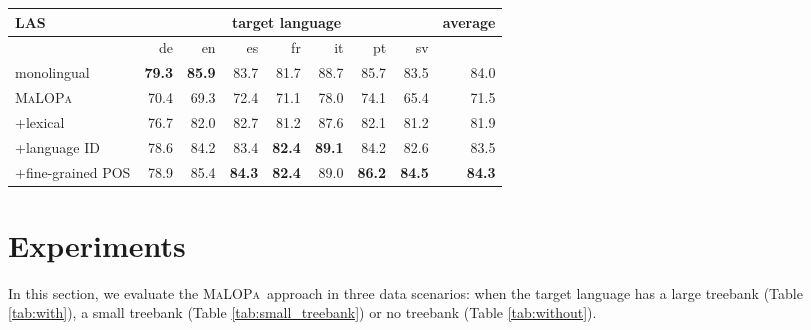 \documentclass[11pt]{article}
\newcommand{\malopa}{\textsc{MaLOPa}}
\begin{document}
\begin{table*}[!]
\centering



\begin{tabular}{l|r|r|r|r|r|r|r||r}
LAS & \multicolumn{7}{c||}{target language} & average \\ \hline
                                                       & {de} & {en} & {es} & {fr} & {it} & {pt} & {sv} & {}   \\ \hline
monolingual                                   & \textbf{79.3} & \textbf{85.9} & 83.7 & 81.7 & 88.7 & 85.7 & 83.5 & 84.0 \\ \hline
\malopa                            & 70.4 & 69.3 & 72.4 & 71.1 & 78.0 & 74.1 & 65.4 & 71.5 \\
                   +lexical                   & 76.7 & 82.0 & 82.7 & 81.2 & 87.6 & 82.1 & 81.2 & 81.9 \\ 
\hspace{0.1cm} +language ID                   & 78.6 & 84.2 & 83.4 & \textbf{82.4} & \textbf{89.1} & 84.2 & 82.6 & 83.5 \\
\hspace{0.3cm} +fine-grained POS              & 78.9 & 85.4 & \textbf{84.3} & \textbf{82.4} & 89.0 & \textbf{86.2} & \textbf{84.5} & \textbf{84.3} \\ \end{tabular}

\caption{Dependency parsing:  labeled attachment scores (LAS) for monolingually-trained parsers and \malopa ~in the fully supervised scenario where $L^t = L^s$. Note that we use the universal dependencies verson 1.2 which only includes annotations for $\sim$13,000 English sentences, which explains the relatively low scores in English. When we instead use the universal dependency treebanks version 2.0 which includes annotations for $\sim$40,000 English sentences (originally from the English Penn Treebank), we achieve UAS score 93.0 and LAS score  91.5.
\label{tab:with}}
\end{table*}

\section{Experiments}

In this section, we evaluate the \malopa~approach in three data scenarios: when the target language has a large treebank (Table \ref{tab:with}), a small treebank (Table \ref{tab:small_treebank}) or no treebank (Table \ref{tab:without}).
\end{document}
